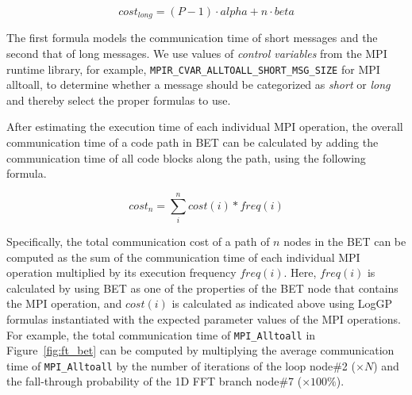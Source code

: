 \begin{equation}
cost_{long} = (P-1)\cdot alpha + n\cdot beta
\end{equation}

The first formula models the communication time of short messages and
the second that of long messages.  We use values of \emph{control
  variables} from the MPI runtime library, for example,
\texttt{MPIR\_CVAR\_ALLTOALL\_SHORT\_MSG\_SIZE} for MPI alltoall, to
determine whether a message should be categorized as {\em short} or
{\em long} and thereby select the proper formulas to use.

After estimating the execution time of each individual MPI operation,
the overall communication time of a code path in BET can be calculated
by adding the communication time of all code blocks along the path,
using the following formula.

\begin{equation}
  cost_{n} = \sum\limits_{i}^{n} cost(i) * freq(i)
\end{equation}

Specifically, the total communication cost of a path of $n$ nodes in
the BET can be computed as the sum of the communication time of each
individual MPI operation multiplied by its execution frequency
$freq(i)$.  Here, $freq(i)$ is calculated by using BET as one of the
properties of the BET node that contains the MPI operation, and
$cost(i)$ is calculated as indicated above using LogGP formulas
instantiated with the expected parameter values of the MPI operations.
For example, the total communication time of \texttt{MPI\_Alltoall} in
Figure~\ref{fig:ft_bet} can be computed by multiplying the average
communication time of \texttt{MPI\_Alltoall} by the number of
iterations of the loop node\#2 ($\times N$) and the fall-through
probability of the 1D FFT branch node\#7 ($\times 100\%$).
